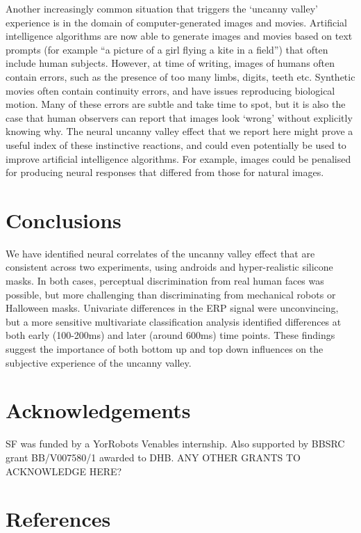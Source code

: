 \documentclass[
]{article}
\begin{document}
Another increasingly common situation that triggers the `uncanny valley' experience is in the domain of computer-generated images and movies. Artificial intelligence algorithms are now able to generate images and movies based on text prompts (for example ``a picture of a girl flying a kite in a field'') that often include human subjects. However, at time of writing, images of humans often contain errors, such as the presence of too many limbs, digits, teeth etc. Synthetic movies often contain continuity errors, and have issues reproducing biological motion. Many of these errors are subtle and take time to spot, but it is also the case that human observers can report that images look `wrong' without explicitly knowing why. The neural uncanny valley effect that we report here might prove a useful index of these instinctive reactions, and could even potentially be used to improve artificial intelligence algorithms. For example, images could be penalised for producing neural responses that differed from those for natural images.

\hypertarget{conclusions}{%
\section{Conclusions}\label{conclusions}}

We have identified neural correlates of the uncanny valley effect that are consistent across two experiments, using androids and hyper-realistic silicone masks. In both cases, perceptual discrimination from real human faces was possible, but more challenging than discriminating from mechanical robots or Halloween masks. Univariate differences in the ERP signal were unconvincing, but a more sensitive multivariate classification analysis identified differences at both early (100-200ms) and later (around 600ms) time points. These findings suggest the importance of both bottom up and top down influences on the subjective experience of the uncanny valley.

\hypertarget{acknowledgements}{%
\section{Acknowledgements}\label{acknowledgements}}

SF was funded by a YorRobots Venables internship. Also supported by BBSRC grant BB/V007580/1 awarded to DHB. ANY OTHER GRANTS TO ACKNOWLEDGE HERE?

\hypertarget{references}{%
\section*{References}\label{references}}
\end{document}
